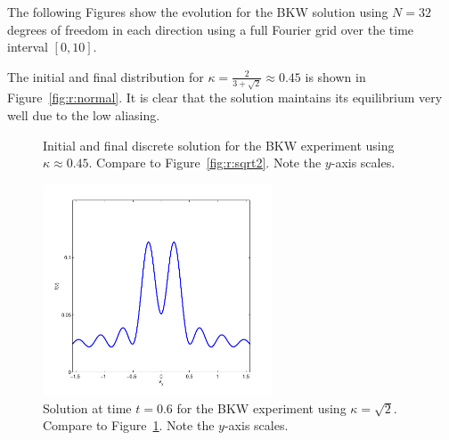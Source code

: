 The following Figures show the evolution for the BKW solution using $N=32$
degrees of freedom in each direction using a full Fourier grid over the time
interval $[0,10]$.

The initial and final distribution for $\kappa=\frac{2}{3+\sqrt{2}}\approx
0.45$ is shown in Figure~\vref{fig:r:normal}. It is clear that the solution
maintains its equilibrium very well due to the low aliasing.

\begin{figure}
    \centering
    \caption{Initial and final discrete solution for the BKW experiment using $\kappa\approx0.45$. Compare to
    Figure~\vref{fig:r:sqrt2}. Note the $y$-axis scales.}
    \label{fig:r:normal}
\end{figure}

\begin{figure}
    \centering
    \includegraphics[width=6.8cm]{figs/hcboltz/bkw-r-sqrt2-end}
    \caption{Solution at time $t=0.6$ for the BKW experiment using $\kappa=\sqrt{2}$. Compare to
    Figure~\ref{fig:r:normal}. Note the $y$-axis scales.}
    \label{fig:r:sqrt2}
\end{figure}


